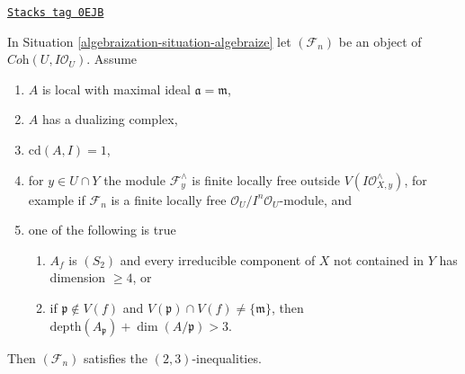 \begin{lemma}
\label{algebraization-lemma-unwinding-conditions-bis}
\href{https://stacks.math.columbia.edu/tag/0EJB}{\texttt{Stacks tag 0EJB}}

In Situation \ref{algebraization-situation-algebraize} let $(\mathcal{F}_n)$ be an object
of $\textit{Coh}(U, I\mathcal{O}_U)$. Assume
\begin{enumerate}
\item $A$ is local with maximal ideal $\mathfrak a = \mathfrak m$,
\item $A$ has a dualizing complex,
\item $\text{cd}(A, I) = 1$,
\item for $y \in U \cap Y$ the module $\mathcal{F}_y^\wedge$
is finite locally free outside $V(I\mathcal{O}_{X, y}^\wedge)$,
for example if $\mathcal{F}_n$ is a finite locally free
$\mathcal{O}_U/I^n\mathcal{O}_U$-module, and
\item one of the following is true
\begin{enumerate}
\item $A_f$ is $(S_2)$ and every irreducible component of $X$
not contained in $Y$ has dimension $\geq 4$, or
\item if $\mathfrak p \not \in V(f)$ and
$V(\mathfrak p) \cap V(f) \not = \{\mathfrak m\}$, then
$\text{depth}(A_\mathfrak p) + \dim(A/\mathfrak p) > 3$.
\end{enumerate}
\end{enumerate}
Then $(\mathcal{F}_n)$ satisfies the $(2, 3)$-inequalities.
\end{lemma}

